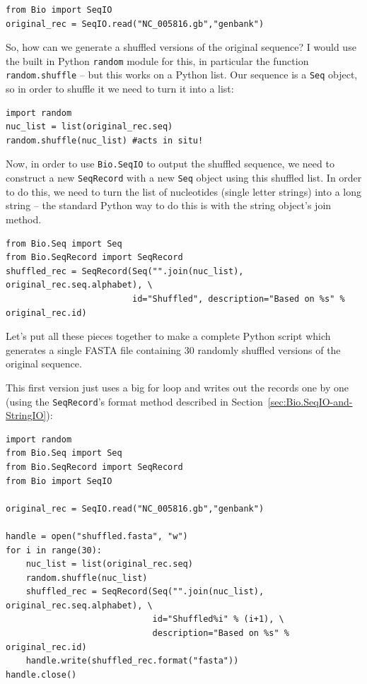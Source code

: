 \documentclass{report}
\begin{document}
\begin{verbatim}
from Bio import SeqIO
original_rec = SeqIO.read("NC_005816.gb","genbank")
\end{verbatim}

So, how can we generate a shuffled versions of the original sequence?  I would
use the built in Python \verb|random| module for this, in particular the function
\verb|random.shuffle| -- but this works on a Python list.  Our sequence is a
\verb|Seq| object, so in order to shuffle it we need to turn it into a list:

\begin{verbatim}
import random
nuc_list = list(original_rec.seq)
random.shuffle(nuc_list) #acts in situ!
\end{verbatim}

Now, in order to use \verb|Bio.SeqIO| to output the shuffled sequence, we need
to construct a new \verb|SeqRecord| with a new \verb|Seq| object using this
shuffled list.  In order to do this, we need to turn the list of nucleotides
(single letter strings) into a long string -- the standard Python way to do
this is with the string object's join method.

\begin{verbatim}
from Bio.Seq import Seq
from Bio.SeqRecord import SeqRecord
shuffled_rec = SeqRecord(Seq("".join(nuc_list), original_rec.seq.alphabet), \
                         id="Shuffled", description="Based on %s" % original_rec.id)
\end{verbatim}

Let's put all these pieces together to make a complete Python script which
generates a single FASTA file containing 30 randomly shuffled versions of
the original sequence.

This first version just uses a big for loop and writes out the records one by one
(using the \verb|SeqRecord|'s format method described in
Section~\ref{sec:Bio.SeqIO-and-StringIO}):

\begin{verbatim}
import random
from Bio.Seq import Seq
from Bio.SeqRecord import SeqRecord
from Bio import SeqIO

original_rec = SeqIO.read("NC_005816.gb","genbank")

handle = open("shuffled.fasta", "w")
for i in range(30):
    nuc_list = list(original_rec.seq)
    random.shuffle(nuc_list)
    shuffled_rec = SeqRecord(Seq("".join(nuc_list), original_rec.seq.alphabet), \
                             id="Shuffled%i" % (i+1), \
                             description="Based on %s" % original_rec.id)
    handle.write(shuffled_rec.format("fasta"))
handle.close()
\end{verbatim}
\end{document}
